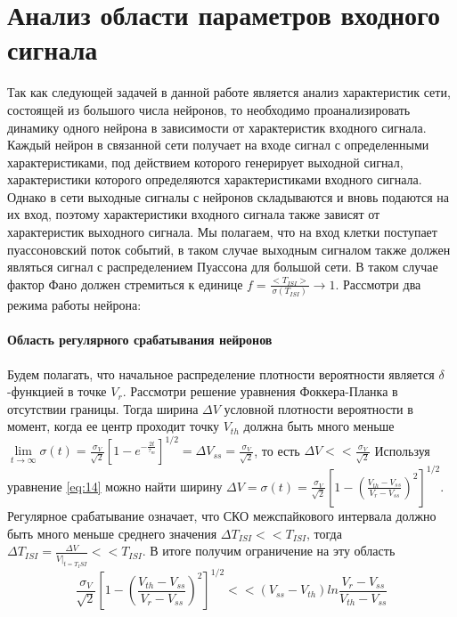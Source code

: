 \section{Анализ области параметров входного сигнала}
Так как следующей задачей в данной работе является анализ характеристик сети, состоящей из большого числа нейронов, то необходимо проанализировать динамику одного нейрона в зависимости от характеристик входного сигнала. Каждый нейрон в связанной сети получает на входе сигнал с определенными характеристиками, под действием которого генерирует выходной сигнал, характеристики которого определяются характеристиками входного сигнала. Однако в сети выходные сигналы с нейронов складываются и вновь подаются на их вход, поэтому характеристики входного сигнала также зависят от характеристик выходного сигнала. Мы полагаем, что на вход клетки поступает пуассоновский поток событий, в таком случае выходным сигналом также должен являться сигнал с распределением Пуассона для большой сети. В таком случае фактор Фано должен стремиться к единице $\displaystyle f=\frac{<T_{ISI}>}{\sigma(T_{ISI})}\to 1$. Рассмотри два режима работы нейрона:
\paragraph{Область регулярного срабатывания нейронов}

Будем полагать, что начальное распределение плотности вероятности является $\delta$-функцией в точке $V_r$. Рассмотри решение уравнения Фоккера-Планка в отсутствии границы. Тогда ширина $\Delta V$ условной плотности вероятности в момент, когда ее центр проходит точку $V_{th}$ должна быть много меньше $\displaystyle \lim\limits_{t\to\infty}\sigma(t)=\frac{\sigma_V}{\sqrt{2}}\left[1-e^{-\frac{2t}{\tau_m}}\right]^{1/2}=\Delta V_{ss}=\frac{\sigma_V}{\sqrt{2}}$, то есть $\displaystyle \Delta V<<\frac{\sigma_V}{\sqrt{2}}$
Используя уравнение \eqref{eq:14} можно найти ширину $\displaystyle \Delta V=\sigma(t)=\frac{\sigma_V}{\sqrt{2}}\left[1-\left(\frac{V_{th}-V_{ss}}{V_r-V_{ss}}\right)^2\right]^{1/2}$. Регулярное срабатывание означает, что СКО межспайкового интервала должно быть много меньше среднего значения $\Delta T_{ISI}<<T_{ISI}$, тогда $\displaystyle\Delta T_{ISI}=\frac{\Delta V}{\dot{V}|_{t=T_ISI}}<<T_{ISI}$. В итоге получим ограничение на эту область
\begin{equation}
\frac{\sigma_V}{\sqrt{2}}\left[1-\left(\frac{V_{th}-V_{ss}}{V_r-V_{ss}}\right)^2\right]^{1/2}<<(V_{ss}-V_{th})ln\frac{V_r-V_{ss}}{V_{th}-V_{ss}}
\label{eq:16}
\end{equation}
